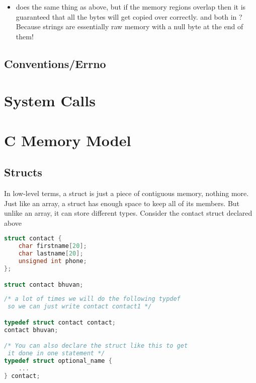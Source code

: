 \begin{itemize}
	\item {} does the same thing as above, but if the memory regions overlap then it is guaranteed that all the bytes will get copied over correctly.  and  both in ? Because strings are essentially raw memory with a null byte at the end of them!

\end{itemize}

\subsection{Conventions/Errno}


\section{System Calls}


\section{C Memory Model}

\subsection{Structs}

In low-level terms, a struct is just a piece of contiguous memory, nothing more. Just like an array, a struct has enough space to keep all of its members. But unlike an array, it can store different types. Consider the contact struct declared above

\begin{lstlisting}[language=C]
struct contact {
    char firstname[20];
    char lastname[20];
    unsigned int phone;
};

struct contact bhuvan;
\end{lstlisting}

\begin{lstlisting}[language=C]
/* a lot of times we will do the following typdef
 so we can just write contact contact1 */

typedef struct contact contact;
contact bhuvan;

/* You can also declare the struct like this to get
 it done in one statement */
typedef struct optional_name {
    ...
} contact;
\end{lstlisting}

